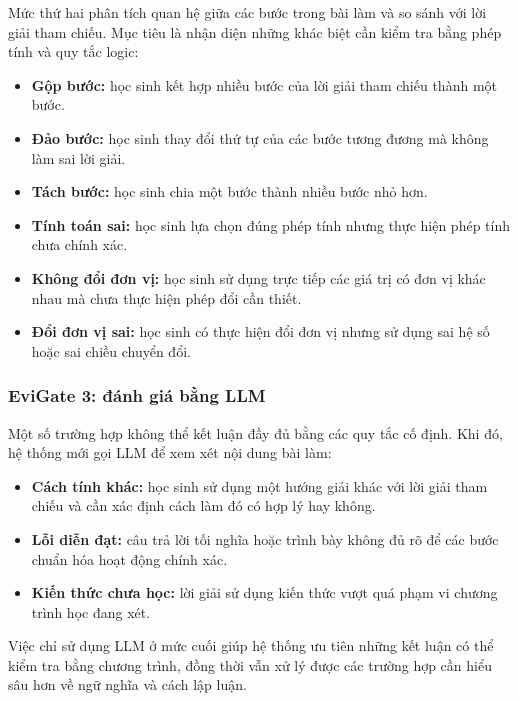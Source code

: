 \documentclass[12pt,a4paper]{article}
\begin{document}
Mức thứ hai phân tích quan hệ giữa các bước trong bài làm và so sánh với lời
giải tham chiếu. Mục tiêu là nhận diện những khác biệt cần kiểm tra bằng phép
tính và quy tắc logic:

\begin{itemize}[leftmargin=*]
    \item \textbf{Gộp bước:} học sinh kết hợp nhiều bước của lời giải tham chiếu
    thành một bước.
    \item \textbf{Đảo bước:} học sinh thay đổi thứ tự của các bước tương đương
    mà không làm sai lời giải.
    \item \textbf{Tách bước:} học sinh chia một bước thành nhiều bước nhỏ hơn.
    \item \textbf{Tính toán sai:} học sinh lựa chọn đúng phép tính nhưng thực
    hiện phép tính chưa chính xác.
    \item \textbf{Không đổi đơn vị:} học sinh sử dụng trực tiếp các giá trị có
    đơn vị khác nhau mà chưa thực hiện phép đổi cần thiết.
    \item \textbf{Đổi đơn vị sai:} học sinh có thực hiện đổi đơn vị nhưng sử
    dụng sai hệ số hoặc sai chiều chuyển đổi.
\end{itemize}

\subsubsection{EviGate 3: đánh giá bằng LLM}

Một số trường hợp không thể kết luận đầy đủ bằng các quy tắc cố định. Khi đó,
hệ thống mới gọi LLM để xem xét nội dung bài làm:

\begin{itemize}[leftmargin=*]
    \item \textbf{Cách tính khác:} học sinh sử dụng một hướng giải khác với lời
    giải tham chiếu và cần xác định cách làm đó có hợp lý hay không.
    \item \textbf{Lỗi diễn đạt:} câu trả lời tối nghĩa hoặc trình bày không đủ rõ
    để các bước chuẩn hóa hoạt động chính xác.
    \item \textbf{Kiến thức chưa học:} lời giải sử dụng kiến thức vượt quá phạm
    vi chương trình học đang xét.
\end{itemize}

Việc chỉ sử dụng LLM ở mức cuối giúp hệ thống ưu tiên những kết luận có thể kiểm
tra bằng chương trình, đồng thời vẫn xử lý được các trường hợp cần hiểu sâu hơn
về ngữ nghĩa và cách lập luận.
\end{document}
